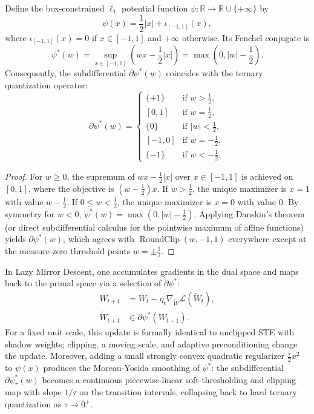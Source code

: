 \begin{proposition}
Define the box-constrained $\ell_1$ potential function $\psi: \mathbb{R} \to \mathbb{R} \cup \{+\infty\}$ by
\begin{equation}
    \psi(x) = \frac{1}{2}|x| + \iota_{[-1, 1]}(x),
\end{equation}
where $\iota_{[-1,1]}(x) = 0$ if $x \in [-1,1]$ and $+\infty$ otherwise. Its Fenchel conjugate is
\begin{equation}
    \psi^*(w) = \sup_{x \in [-1,1]} \left(wx - \frac{1}{2}|x|\right) = \max\!\left(0, |w| - \frac{1}{2}\right).
\end{equation}
Consequently, the subdifferential $\partial \psi^*(w)$ coincides with the ternary quantization operator:
\begin{equation}
    \partial \psi^*(w) = \begin{cases}
        \{+1\} & \text{if } w > \tfrac{1}{2}, \\
        [0, 1] & \text{if } w = \tfrac{1}{2}, \\
        \{0\} & \text{if } |w| < \tfrac{1}{2}, \\
        [-1, 0] & \text{if } w = -\tfrac{1}{2}, \\
        \{-1\} & \text{if } w < -\tfrac{1}{2}.
    \end{cases}
\end{equation}
\end{proposition}

\begin{proof}
For $w \ge 0$, the supremum of $wx - \frac{1}{2}|x|$ over $x \in [-1, 1]$ is achieved on $[0, 1]$, where the objective is $(w - \frac{1}{2})x$. If $w > \frac{1}{2}$, the unique maximizer is $x = 1$ with value $w - \frac{1}{2}$. If $0 \le w < \frac{1}{2}$, the unique maximizer is $x = 0$ with value $0$. By symmetry for $w < 0$, $\psi^*(w) = \max(0, |w| - \frac{1}{2})$. Applying Danskin's theorem (or direct subdifferential calculus for the pointwise maximum of affine functions) yields $\partial \psi^*(w)$, which agrees with $\operatorname{RoundClip}(w, -1, 1)$ everywhere except at the measure-zero threshold points $w = \pm \frac{1}{2}$.
\end{proof}

In Lazy Mirror Descent, one accumulates gradients in the dual space and maps back to the primal space via a selection of $\partial\psi^*$:
\begin{align}
    W_{t+1} &= W_t - \eta_t \nabla_{\widetilde{W}} \mathcal{L}(\widetilde{W}_t), \\
    \widetilde{W}_{t+1} &\in \partial \psi^*(W_{t+1}).
\end{align}
For a fixed unit scale, this update is formally identical to unclipped STE with shadow weights; clipping, a moving scale, and adaptive preconditioning change the update. Moreover, adding a small strongly convex quadratic regularizer $\frac{\tau}{2}x^2$ to $\psi(x)$ produces the Moreau-Yosida smoothing of $\psi^*$: the subdifferential $\partial \psi_\tau^*(w)$ becomes a continuous piecewise-linear soft-thresholding and clipping map with slope $1/\tau$ on the transition intervals, collapsing back to hard ternary quantization as $\tau \to 0^+$.

